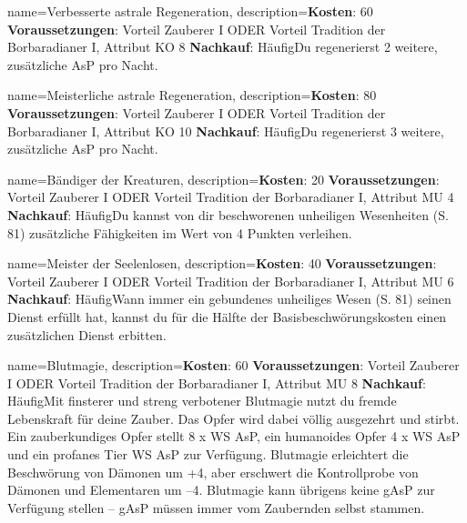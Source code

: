 {
    name={Verbesserte astrale Regeneration},
    description={\textbf{Kosten}: 60 \textbf{Voraussetzungen}: Vorteil Zauberer I ODER Vorteil Tradition der Borbaradianer I, Attribut KO 8 \textbf{Nachkauf}: Häufig\newline Du regenerierst 2 weitere, zusätzliche AsP pro Nacht.}
}


{
    name={Meisterliche astrale Regeneration},
    description={\textbf{Kosten}: 80 \textbf{Voraussetzungen}: Vorteil Zauberer I ODER Vorteil Tradition der Borbaradianer I, Attribut KO 10 \textbf{Nachkauf}: Häufig\newline Du regenerierst 3 weitere, zusätzliche AsP pro Nacht.}
}


{
    name={Bändiger der Kreaturen},
    description={\textbf{Kosten}: 20 \textbf{Voraussetzungen}: Vorteil Zauberer I ODER Vorteil Tradition der Borbaradianer I, Attribut MU 4 \textbf{Nachkauf}: Häufig\newline Du kannst von dir beschworenen unheiligen Wesenheiten (S. 81) zusätzliche Fähigkeiten im Wert von 4 Punkten verleihen.}
}


{
    name={Meister der Seelenlosen},
    description={\textbf{Kosten}: 40 \textbf{Voraussetzungen}: Vorteil Zauberer I ODER Vorteil Tradition der Borbaradianer I, Attribut MU 6 \textbf{Nachkauf}: Häufig\newline Wann immer ein gebundenes unheiliges Wesen (S. 81) seinen Dienst erfüllt hat, kannst du für die Hälfte der Basisbeschwörungskosten einen zusätzlichen Dienst erbitten.}
}


{
    name={Blutmagie},
    description={\textbf{Kosten}: 60 \textbf{Voraussetzungen}: Vorteil Zauberer I ODER Vorteil Tradition der Borbaradianer I, Attribut MU 8 \textbf{Nachkauf}: Häufig\newline Mit finsterer und streng verbotener Blutmagie nutzt du fremde Lebenskraft für deine Zauber. Das Opfer wird dabei völlig ausgezehrt und stirbt. Ein zauberkundiges Opfer stellt 8 x WS AsP, ein humanoides Opfer 4 x WS AsP und ein profanes Tier WS AsP zur Verfügung. Blutmagie erleichtert die Beschwörung von Dämonen um +4, aber erschwert die Kontrollprobe von Dämonen und Elementaren um –4. Blutmagie kann übrigens keine gAsP zur Verfügung stellen – gAsP müssen immer vom Zaubernden selbst stammen.}
}


